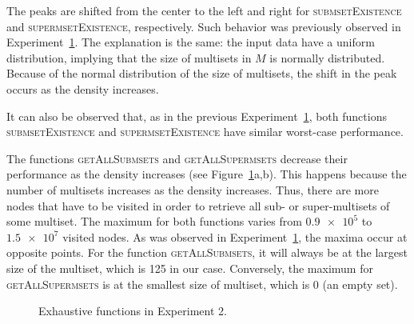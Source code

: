 \documentclass[algorithms,article,accept,pdftex,moreauthors]{Definitions/mdpi}
\begin{document}
The peaks are shifted from the center to the left and right for 
\textsc{submsetExistence} and \textsc{supermsetExistence}, respectively. Such 
behavior was previously observed in Experiment~\hyperref[s:exp1]{1}. The 
explanation is the same: the input data have a uniform distribution, implying that 
the size of multisets in $M$ is normally distributed. Because of the normal 
distribution of the size of multisets, the shift in the peak occurs as the density increases.

It can also be observed that, as in the previous Experiment~\hyperref[s:exp1]{1}, both 
functions \textsc{submsetExistence} and \textsc{supermsetExistence} have similar 
worst-case performance. 

The functions \textsc{getAllSubmsets} and \textsc{getAllSupermsets} decrease 
their performance as the density increases (see Figure~\ref{fig:e2m3}a,b). This happens because the number of multisets increases as 
the density increases. Thus, there are more nodes that have to be visited in order to 
retrieve all sub- or super-multisets of some multiset. The maximum for both functions 
varies from $\num{0.9e5}$ to $\num{1.5e7}$ visited nodes. As was observed in 
Experiment~\hyperref[s:exp1]{1}, the maxima occur at opposite points. For the 
function \textsc{getAllSubmsets}, it will always be at the largest size of the multiset, 
which is 125 in our case. Conversely, the maximum for \textsc{getAllSupermsets} 
is at the smallest size of multiset, which is 0 (an empty set).

\begin{figure}[H]

\caption{Exhaustive functions in Experiment 2.\label{fig:e2m3}}
\end{figure}
\end{document}
